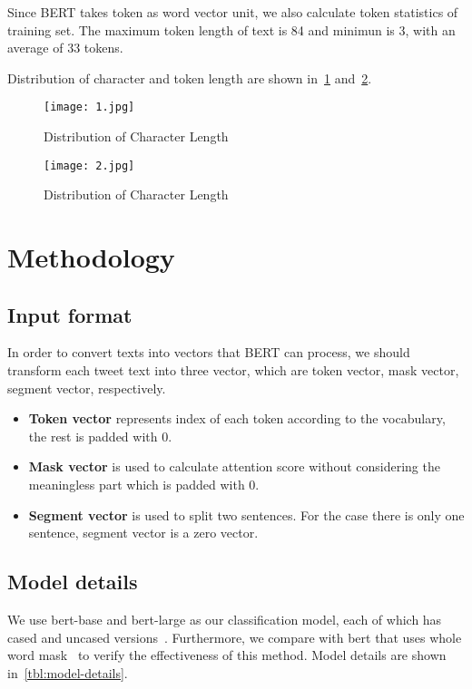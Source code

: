 \documentclass{amsart}
\begin{document}
  Since BERT takes token as word vector unit, we also calculate token statistics of training set. The maximum token length of text is 84 and minimun is 3, with an average of 33 tokens. 

  Distribution of character and token length are shown in~\cref{figure-character-dist} and~\cref{figure-token-dist}.

\begin{figure}
    \centering
    \texttt{[image: 1.jpg]}
    \caption{Distribution of Character Length}
    \label{figure-character-dist}
\end{figure}

\begin{figure}
    \centering
    \texttt{[image: 2.jpg]}
    \caption{Distribution of Character Length}
    \label{figure-token-dist}
\end{figure}




\bigskip \bigskip
\section{Methodology} \label{sec-methodology}

\subsection{Input format}
In order to convert texts into vectors that BERT can process, we should transform each tweet text into three vector, which are token vector, mask vector, segment vector, respectively.
\begin{itemize}
    \item \textbf{Token vector} represents index of each token according to the vocabulary, the rest is padded with 0.
    \item \textbf{Mask vector} is used to calculate attention score without considering the meaningless part which is padded with 0.
    \item \textbf{Segment vector} is used to split two sentences. For the case there is only one sentence, segment vector is a zero vector.
\end{itemize}

\subsection{Model details}
We use bert-base and bert-large as our classification model, each of which has cased and uncased versions~\cite{devlin2018bert}. Furthermore, we compare with bert that uses whole word mask~\cite{cui2021pre} to verify the effectiveness of this method. Model details are shown in~\cref{tbl:model-details}.
\end{document}

